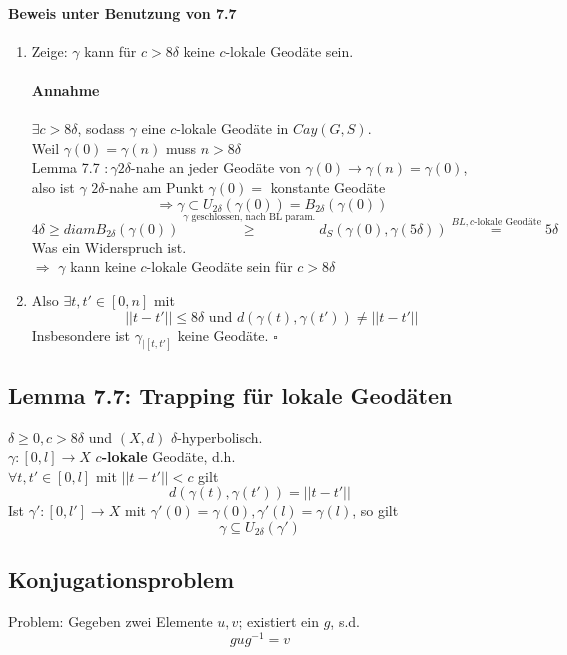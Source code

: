 \documentclass{article}
\newcommand{\df}[1]{\textbf{#1}\index{#1}}
\newcommand{\qed}{\hfill $\square$}
\newcommand{\norm}[1]{\left|\left|#1\right|\right|}
\begin{document}
\paragraph{Beweis unter Benutzung von 7.7}
\begin{enumerate}
	\item Zeige: $\gamma$ kann für $c > 8\delta$ keine $c$-lokale Geodäte sein.\\
	\paragraph{Annahme} $\exists c > 8 \delta$, sodass $\gamma$ eine $c$-lokale Geodäte in $Cay(G,S)$.\\
	Weil $\gamma(0) = \gamma(n)$ muss $n > 8\delta$\\
	Lemma 7.7 $: \gamma 2\delta$-nahe an jeder Geodäte von $\gamma(0) \rightarrow \gamma(n) = \gamma(0)$,\\
	also ist $\gamma$ $2\delta$-nahe am Punkt $\gamma(0) = $ konstante Geodäte\\
	\[\Longrightarrow \gamma \subset U_{2\delta}(\gamma(0)) = B_{2\delta}(\gamma(0)) \]
	\[ 4\delta \geq diam B_{2\delta}(\gamma(0)) \overset{\gamma \text{ geschlossen, nach BL param.}}{\geq} d_S(\gamma(0), \gamma(5\delta)) \overset{BL, c\text{-lokale Geodäte}}{=} 5\delta \]
	Was ein Widerspruch ist.\\
	$\Longrightarrow$ $\gamma$ kann keine $c$-lokale Geodäte sein für $c > 8\delta$
	\item Also $\exists t, t' \in [0,n]$ mit
	\[ \norm{t - t'} \leq 8\delta \text{ und } d(\gamma(t), \gamma(t')) \neq \norm{t -t'} \]
	Insbesondere ist $\gamma_{|[t,t']}$ keine Geodäte. \qed
\end{enumerate}


\subsection{Lemma 7.7: Trapping für lokale Geodäten}
$\delta \geq 0, c > 8 \delta$ und $(X,d)$ $\delta$-hyperbolisch.\\
$\gamma:[0,l] \rightarrow X$ \df{$c$-lokale} Geodäte, d.h.\\
$\forall t, t' \in [0,l]$ mit $\norm{t - t'} < c$ gilt
\[d(\gamma(t), \gamma(t')) = \norm{t -t'}\]
Ist $\gamma':[0,l'] \rightarrow X$ mit $\gamma'(0) = \gamma(0), \gamma'(l) = \gamma(l)$, so gilt
\[\gamma \subseteq U_{2\delta}(\gamma') \]


\subsection{Konjugationsproblem}
Problem: Gegeben zwei Elemente $u,v$; existiert ein $g$, s.d.
\[gug^{-1} =v \]
\end{document}
